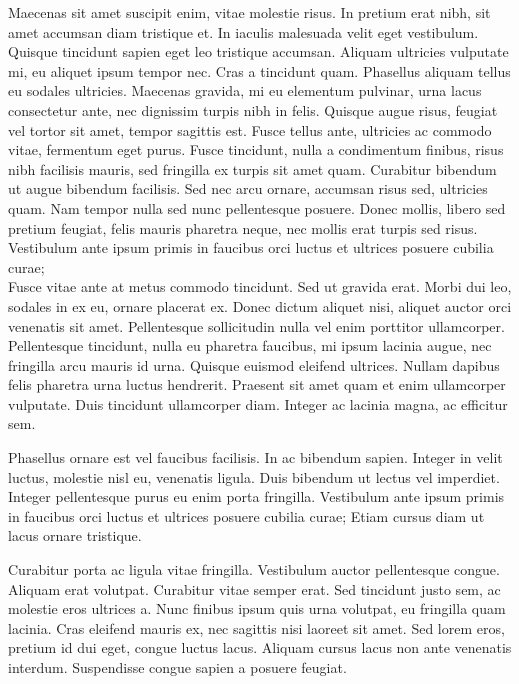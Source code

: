 \begin{refsection}
Maecenas sit amet suscipit enim, vitae molestie risus. In pretium erat nibh, sit amet accumsan diam tristique et. In iaculis malesuada velit eget vestibulum. Quisque tincidunt sapien eget leo tristique accumsan. Aliquam ultricies vulputate mi, eu aliquet ipsum tempor nec. Cras a tincidunt quam. Phasellus aliquam tellus eu sodales ultricies. Maecenas gravida, mi eu elementum pulvinar, urna lacus consectetur ante, nec dignissim turpis nibh in felis. Quisque augue risus, feugiat vel tortor sit amet, tempor sagittis est. Fusce tellus ante, ultricies ac commodo vitae, fermentum eget purus. Fusce tincidunt, nulla a condimentum finibus, risus nibh facilisis mauris, sed fringilla ex turpis sit amet quam. Curabitur bibendum ut augue bibendum facilisis. Sed nec arcu ornare, accumsan risus sed, ultricies quam. Nam tempor nulla sed nunc pellentesque posuere. Donec mollis, libero sed pretium feugiat, felis mauris pharetra neque, nec mollis erat turpis sed risus. Vestibulum ante ipsum primis in faucibus orci luctus et ultrices posuere cubilia curae;\\
Fusce vitae ante at metus commodo tincidunt. Sed ut gravida erat. Morbi dui leo, sodales in ex eu, ornare placerat ex. Donec dictum aliquet nisi, aliquet auctor orci venenatis sit amet. Pellentesque sollicitudin nulla vel enim porttitor ullamcorper. Pellentesque tincidunt, nulla eu pharetra faucibus, mi ipsum lacinia augue, nec fringilla arcu mauris id urna. Quisque euismod eleifend ultrices. Nullam dapibus felis pharetra urna luctus hendrerit. Praesent sit amet quam et enim ullamcorper vulputate. Duis tincidunt ullamcorper diam. Integer ac lacinia magna, ac efficitur sem.

Phasellus ornare est vel faucibus facilisis. In ac bibendum sapien. Integer in velit luctus, molestie nisl eu, venenatis ligula. Duis bibendum ut lectus vel imperdiet. Integer pellentesque purus eu enim porta fringilla. Vestibulum ante ipsum primis in faucibus orci luctus et ultrices posuere cubilia curae; Etiam cursus diam ut lacus ornare tristique.

Curabitur porta ac ligula vitae fringilla. Vestibulum auctor pellentesque congue. Aliquam erat volutpat. Curabitur vitae semper erat. Sed tincidunt justo sem, ac molestie eros ultrices a. Nunc finibus ipsum quis urna volutpat, eu fringilla quam lacinia. Cras eleifend mauris ex, nec sagittis nisi laoreet sit amet. Sed lorem eros, pretium id dui eget, congue luctus lacus. Aliquam cursus lacus non ante venenatis interdum. Suspendisse congue sapien a posuere feugiat.


\end{refsection}
